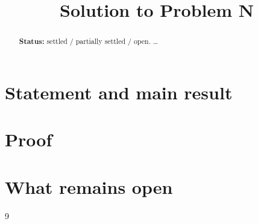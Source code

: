\documentclass[12pt]{article}
\title{Solution to Problem N}
\author{}
\date{}
\theoremstyle{definition}
\theoremstyle{remark}
\begin{document}
\maketitle

\begin{abstract}
\textbf{Status:} settled / partially settled / open. \dots
\end{abstract}

\section{Statement and main result}

\section{Proof}

\section{What remains open}

\begin{thebibliography}{9}
\end{thebibliography}
\end{document}
